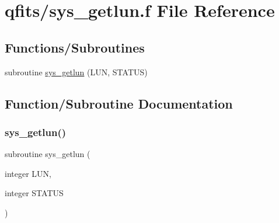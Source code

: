 \hypertarget{qfits_2sys__getlun_8f}{}\section{qfits/sys\+\_\+getlun.f File Reference}
\label{qfits_2sys__getlun_8f}
\subsection*{Functions/\+Subroutines}
\begin{DoxyCompactItemize}
\item 
subroutine \hyperlink{qfits_2sys__getlun_8f_aa6de0ee0eb7b66980dc5c8376257dfea}{sys\+\_\+getlun} (L\+UN, S\+T\+A\+T\+US)
\end{DoxyCompactItemize}


\subsection{Function/\+Subroutine Documentation}
\mbox{\label{qfits_2sys__getlun_8f_aa6de0ee0eb7b66980dc5c8376257dfea}} 
\subsubsection{\texorpdfstring{sys\+\_\+getlun()}{sys\_getlun()}}
{\footnotesize\ttfamily subroutine sys\+\_\+getlun (\begin{DoxyParamCaption}\item[{integer}]{L\+UN,  }\item[{integer}]{S\+T\+A\+T\+US }\end{DoxyParamCaption})}

